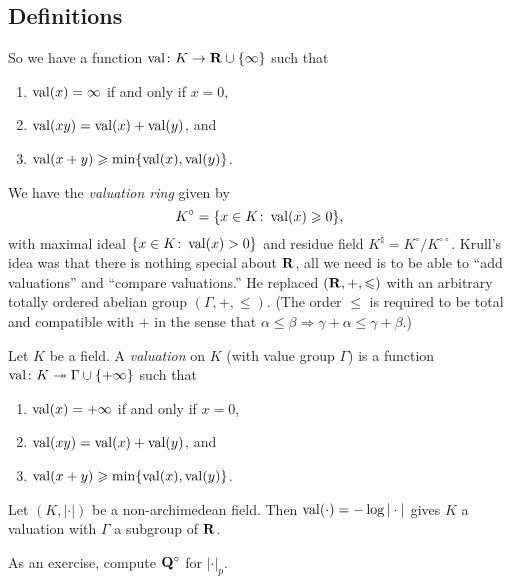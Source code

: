 \subsection{Definitions}

So we have a function $\operatorname{val}\colon K \to \mathbf{R}\cup\{\infty\}$ such that 
\begin{enumerate}
\item
$\operatorname{val}(x)=\infty$ if and only if $x=0$, 

\item
$\operatorname{val}(x y) = \operatorname{val}(x)+\operatorname{val}(y)$, and 

\item
$\operatorname{val}(x+y)\geqslant \min\{\operatorname{val}(x),\operatorname{val}(y)\}$. 
\end{enumerate}
We have the \emph{valuation ring} given by 
\[
  K^\circ = \{x\in K\colon \operatorname{val}(x) \geqslant 0\} ,
\]
with maximal ideal $\{x\in K\colon \operatorname{val}(x)>0\}$ and residue field 
$K^\natural=K^\circ/K^{\circ\circ}$. Krull's idea was that there is nothing 
special about $\mathbf{R}$, all we need is to be able to ``add valuations'' and 
``compare valuations.'' He replaced $(\mathbf{R},+,\leqslant)$ with an arbitrary 
totally ordered abelian group $(\Gamma,+,\leqslant)$. (The order $\leqslant$ is 
required to be total and compatible with $+$ in the sense that 
$\alpha\leqslant\beta\Rightarrow\gamma+\alpha\leqslant \gamma+\beta$.)

\begin{definition}
Let $K$ be a field. A \emph{valuation} on $K$ (with value group $\Gamma$) is a 
function $\operatorname{val}\colon K\twoheadrightarrow \Gamma\cup\{+\infty\}$ such that 
\begin{enumerate}
\item
$\operatorname{val}(x)=+\infty$ if and only if $x=0$, 

\item
$\operatorname{val}(x y) = \operatorname{val}(x)+\operatorname{val}(y)$, and 

\item
$\operatorname{val}(x+y)\geqslant \min\{\operatorname{val}(x),\operatorname{val}(y)\}$. 
\end{enumerate}
\end{definition}

\begin{example}
Let $(K,|\cdot|)$ be a non-archimedean field. Then 
$\operatorname{val}(\cdot)=-\log|\cdot|$ gives $K$ a valuation with $\Gamma$ a subgroup 
of $\mathbf{R}$. 
\end{example}

As an exercise, compute $\mathbf{Q}^\circ$ for $|\cdot|_p$. 


